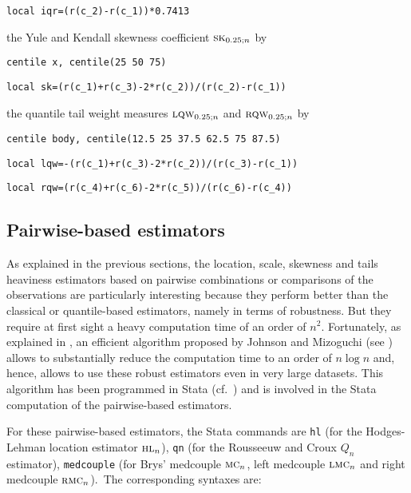 \texttt{local iqr=(r(c\_2)-r(c\_1))*0.7413}

\begin{description}
\item the Yule and Kendall skewness coefficient $\stsc{SK}_{0.25;n}$ by
\end{description}

\texttt{centile x, centile(25 50 75)}

\texttt{local sk=(r(c\_1)+r(c\_3)-2*r(c\_2))/(r(c\_2)-r(c\_1))}

\begin{description}
\item the quantile tail weight measures $\stsc{LQW}_{0.25;n}$ and
$\stsc{RQW}_{0.25;n}$ by
\end{description}

\texttt{centile body, centile(12.5 25 37.5 62.5 75 87.5)}

\texttt{local lqw=-(r(c\_1)+r(c\_3)-2*r(c\_2))/(r(c\_3)-r(c\_1))}

\texttt{local rqw=(r(c\_4)+r(c\_6)-2*r(c\_5))/(r(c\_6)-r(c\_4))}

\subsection{Pairwise-based estimators}

As explained in the previous sections, the location, scale, skewness and tails
heaviness estimators based on pairwise combinations or comparisons of the
observations are particularly interesting because they perform better than the
classical or quantile-based estimators, namely in terms of robustness. But
they require at first sight a heavy computation time of an order of $n^2$.
Fortunately, as explained in \cite{Croux.Rousseeuw (1992)}, an efficient
algorithm proposed by Johnson and Mizoguchi (see \cite{Johnson.Mizoguchi
(1978)}) allows to substantially reduce the computation time to an order of
$n\log n$ and, hence, allows to use these robust estimators even in very large
datasets. This algorithm has been programmed in Stata (cf.\
\cite{Gelade.Verardi.Vermandele (2013)}) and is involved in the Stata
computation of the pairwise-based estimators.

For these pairwise-based estimators, the Stata commands are \texttt{hl} (for
the Hodges-Lehman location estimator $\stsc{HL}_n$), \texttt{qn} (for the
Rousseeuw and Croux $Q_n$ estimator), \texttt{medcouple} (for Brys'
medcouple $\stsc{MC}_n$, left medcouple $\stsc{LMC}_n$ and right
medcouple $\stsc{RMC}_n$).\ The corresponding syntaxes are:

